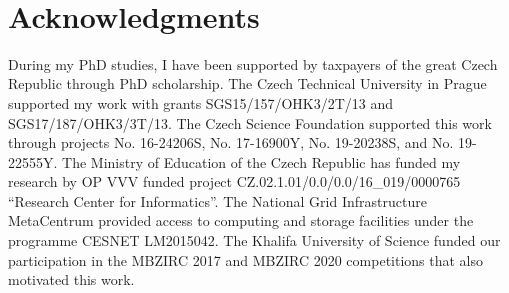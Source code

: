 
~\vfill{}

\section*{Acknowledgments}

\todo{}

During my PhD studies, I have been supported by taxpayers of the great Czech Republic through PhD scholarship.
The Czech Technical University in Prague supported my work with grants SGS15/157/OHK3/2T/13 and SGS17/187/OHK3/3T/13.
The Czech Science Foundation supported this work through projects No. 16-24206S, No. 17-16900Y, No. 19-20238S, and No. 19-22555Y.
The Ministry of Education of the Czech Republic has funded my research by OP VVV funded project CZ.02.1.01/0.0/0.0/16\_019/0000765 “Research Center for Informatics”.
The National Grid Infrastructure MetaCentrum provided access to computing and storage facilities under the programme CESNET LM2015042.
The Khalifa University of Science funded our participation in the MBZIRC 2017 and MBZIRC 2020 competitions that also motivated this work.

\vspace{2.5cm}
